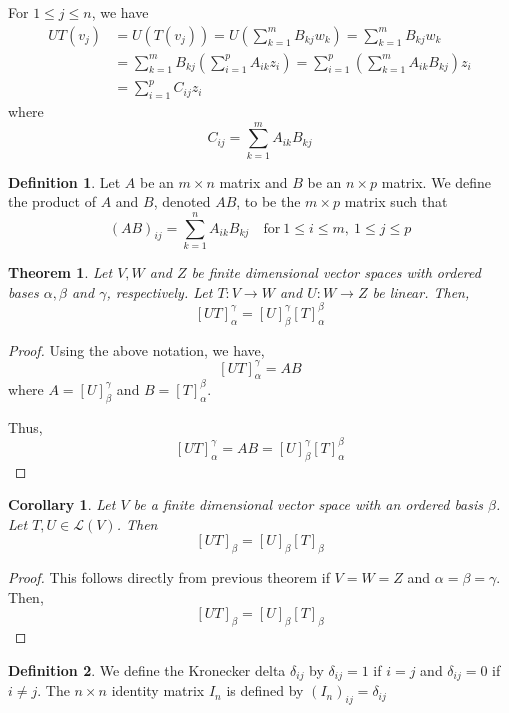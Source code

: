 \documentclass[12pt, a4paper]{article}
\newtheorem{theorem}{Theorem}[section]
\newtheorem{corollary}{Corollary}[theorem]
\theoremstyle{definition}
\newtheorem{definition}{Definition}[section]
\theoremstyle{remark}
\begin{document}
For $1 \le j \le n$, we have
\begin{align*}
    UT(v_j) &= U(T(v_j)) = U\left(\sum_{k=1}^m B_{kj}w_k\right) = \sum_{k=1}^mB_{kj}w_k \\
    &= \sum_{k=1}^m B_{kj}\left(\sum_{i=1}^p A_{ik}z_i\right) = \sum_{i=1}^p\left(\sum_{k=1}^m A_{ik}B_{kj}\right)z_i \\
    &= \sum_{i=1}^p C_{ij}z_i
\end{align*}
where
\[
C_{ij} = \sum_{k=1}^m A_{ik}B_{kj}
\]

\begin{definition}
    Let $A$ be an $m \times n$ matrix and $B$ be an $n \times p$ matrix. We define the product of $A$ and $B$, denoted $AB$, to be the $m \times p$ matrix such that
    \[
    (AB)_{ij} = \sum_{k=1}^n A_{ik}B_{kj} \quad \text{for} \ 1 \le i \le m, \ 1 \le j \le p
    \]
\end{definition}

\begin{theorem}
    Let $V, W$ and $Z$ be finite dimensional vector spaces with ordered bases $\alpha, \beta$ and $\gamma$, respectively. Let $T: V \to W$ and $U: W \to Z$ be linear. Then,
\[ [UT]_{\alpha}^{\gamma} = [U]_{\beta}^{\gamma} [T]_{\alpha}^{\beta} \]
\end{theorem}

\begin{proof}
Using the above notation, we have,
\[ [UT]_{\alpha}^{\gamma} = AB \]
where $A = [U]_{\beta}^{\gamma}$ and $B = [T]_{\alpha}^{\beta}$.

\noindent Thus,
\[ [UT]_{\alpha}^{\gamma} = AB = [U]_{\beta}^{\gamma} [T]_{\alpha}^{\beta} \]
\end{proof}

\begin{corollary}
    Let $V$ be a finite dimensional vector space with an ordered basis $\beta$. Let $T,U \in \mathscr{L}(V)$. Then
    \[[UT]_\beta = [U]_\beta [T]_\beta\]
\end{corollary}

\begin{proof}
    This follows directly from previous theorem if $V=W=Z$ and $\alpha = \beta = \gamma$. Then,
    \[
    [UT]_\beta = [U]_\beta [T]_\beta
    \]
\end{proof}

\begin{definition}
    We define the Kronecker delta $\delta_{ij}$ by $\delta_{ij} = 1$ if $i=j$ and $\delta_{ij} = 0$ if $i \ne j$. The $n \times n$ identity matrix $I_n$ is defined by $(I_n)_{ij} = \delta_{ij}$
\end{definition}
\end{document}
